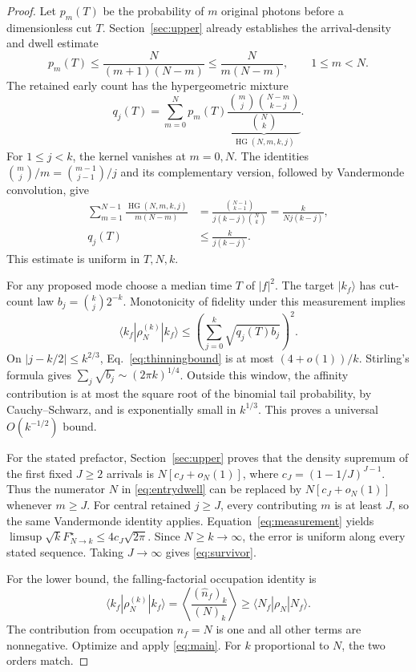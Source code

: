 \documentclass[11pt,a4paper]{article}
\newcommand{\Fock}[2]{\lvert #1_{#2}\rangle}
\newcommand{\HG}{\operatorname{HG}}
\begin{document}
\begin{proof}
Let \(p_m(T)\) be the probability of \(m\) original photons before
a dimensionless cut \(T\). Section~\ref{sec:upper} already establishes
the arrival-density and dwell estimate
\begin{equation}
 p_m(T)\le\frac{N}{(m+1)(N-m)}
 \le\frac{N}{m(N-m)},\qquad 1\le m<N.
 \label{eq:entrydwell}
\end{equation}
The retained early count has the hypergeometric mixture
\begin{equation}
 q_j(T)=\sum_{m=0}^N p_m(T)
 \underbrace{\frac{\binom mj\binom{N-m}{k-j}}{\binom Nk}}
 _{\HG(N,m,k,j)}.
 \label{eq:hypergeom}
\end{equation}
For \(1\le j<k\), the kernel vanishes at \(m=0,N\). The identities
\(\binom mj/m=\binom{m-1}{j-1}/j\) and its complementary version,
followed by Vandermonde convolution, give
\begin{align}
 \sum_{m=1}^{N-1}\frac{\HG(N,m,k,j)}{m(N-m)}
 &=\frac{\binom{N-1}{k-1}}
 {j(k-j)\binom Nk}
 =\frac{k}{N j(k-j)},\\
 q_j(T)&\le\frac{k}{j(k-j)}.
 \label{eq:thinningbound}
\end{align}
This estimate is uniform in \(T,N,k\).

For any proposed mode choose a median time \(T\) of \(|f|^2\).
The target \(\Fock{k}{f}\) has cut-count law
\(b_j=\binom kj2^{-k}\). Monotonicity of fidelity under this
measurement implies
\begin{equation}
 \langle k_f|\rho_N^{(k)}|k_f\rangle
 \le\left(\sum_{j=0}^k\sqrt{q_j(T)b_j}\right)^2.
 \label{eq:measurement}
\end{equation}
On \(|j-k/2|\le k^{2/3}\), Eq.~\eqref{eq:thinningbound} is at most
\((4+o(1))/k\). Stirling's formula gives
\(\sum_j\sqrt{b_j}\sim(2\pi k)^{1/4}\). Outside this window, the
affinity contribution is at most the square root of the binomial
tail probability, by Cauchy--Schwarz, and is exponentially small in
\(k^{1/3}\). This proves a universal \(O(k^{-1/2})\) bound.

For the stated prefactor, Section~\ref{sec:upper} proves that
the density supremum of the first fixed \(J\ge2\) arrivals is
\(N[c_J+o_N(1)]\), where \(c_J=(1-1/J)^{J-1}\).
Thus the numerator \(N\) in \eqref{eq:entrydwell} can be replaced by
\(N[c_J+o_N(1)]\) whenever \(m\ge J\). For central retained
\(j\ge J\), every contributing \(m\) is at least \(J\), so the same
Vandermonde identity applies. Equation~\eqref{eq:measurement} yields
\(\limsup\sqrt{k}F_{N\to k}^\star\le4c_J\sqrt{2\pi}\).
Since \(N\ge k\to\infty\), the error is uniform along every stated
sequence. Taking \(J\to\infty\) gives \eqref{eq:survivor}.

For the lower bound, the falling-factorial occupation identity is
\begin{equation}
 \langle k_f|\rho_N^{(k)}|k_f\rangle
 =\left\langle\frac{(\hat n_f)_k}{(N)_k}\right\rangle
 \ge\langle N_f|\rho_N|N_f\rangle.
 \label{eq:rdmlower}
\end{equation}
The contribution from occupation \(n_f=N\) is one and all other
terms are nonnegative. Optimize and apply \eqref{eq:main}.
For \(k\) proportional to \(N\), the two orders match.
\end{proof}
\end{document}
